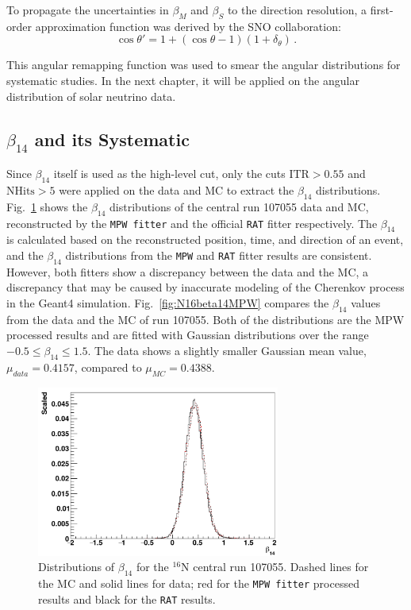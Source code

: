 To propagate the uncertainties in $\beta_M$ and $\beta_S$ to the direction resolution, a first-order approximation function was derived by the SNO collaboration\cite{drouin2012three}:
\begin{equation}\label{remapTheta}
\cos\theta'=1+(\cos\theta-1)(1+\delta_{\theta}) \, .
\end{equation}

This angular remapping function was used to smear the angular distributions for systematic studies. In the next chapter, it will be applied on the angular distribution of solar neutrino data. 

\subsection{$\beta_{14}$ and its Systematic}

Since $\beta_{14}$ itself is used as the high-level cut, only the cuts $\mathrm{ITR}>0.55$ and $\mathrm{NHits}>5$ were applied on the data and MC to extract the $\beta_{14}$ distributions. Fig.~\ref{fig:N16beta14} shows the $\beta_{14}$ distributions of the central run 107055 data and MC, reconstructed by the \texttt{MPW fitter} and the official \texttt{RAT} fitter respectively. The $\beta_{14}$ is calculated based on the reconstructed position, time, and direction of an event, and the $\beta_{14}$ distributions from the \texttt{MPW} and \texttt{RAT} fitter results are consistent. However, both fitters show a discrepancy between the data and the MC, a discrepancy that may be caused by inaccurate modeling of the Cherenkov process in the Geant4 simulation\cite{dunmore2004separation,beta14discrepancy}. Fig.~\ref{fig:N16beta14MPW} compares the $\beta_{14}$ values from the data and the MC of run 107055. Both of the distributions are the MPW processed results and are fitted with Gaussian distributions over the range $-0.5 \le \beta_{14} \le 1.5$. The data shows a slightly smaller Gaussian mean value, $\mu_{data}=0.4157$, compared to $\mu_{MC}=0.4388$.

\begin{figure}[htbp]
	\centering
	\includegraphics[width=8cm]{N16_beta14_107055.png}
	\caption[Distributions of $\beta_{14}$ for the $^{16}$N central run 107055.]{Distributions of $\beta_{14}$ for the $^{16}$N central run 107055. Dashed lines for the MC and solid lines for data; red for the \texttt{MPW fitter} processed results and black for the \texttt{RAT} results. \label{fig:N16beta14}}
\end{figure}

